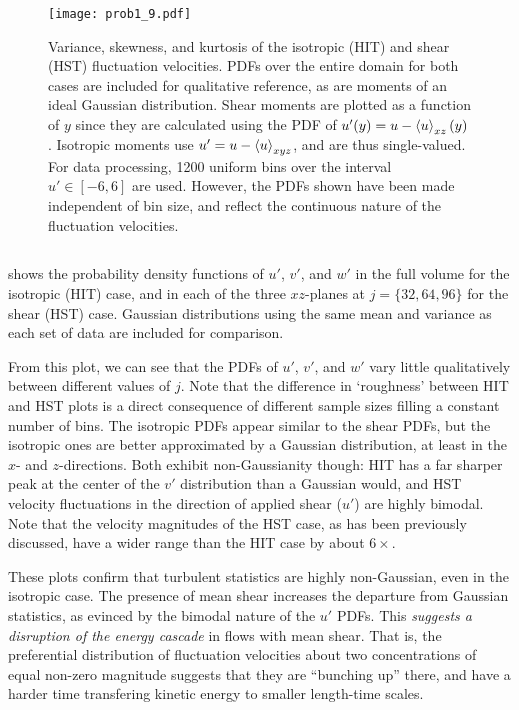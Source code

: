 \documentclass[11pt]{article}
\begin{document}
\begin{figure}[t]
\centering
\texttt{[image: prob1\_9.pdf]}
\vspace{-6pt}
\caption{Variance, skewness, and kurtosis of the isotropic (HIT) and shear (HST) fluctuation velocities. PDFs over the entire domain for both cases are included for qualitative reference, as are moments of an ideal Gaussian distribution. Shear moments are plotted as a function of $y$ since they are calculated using the PDF of $u'(y) = u - \left< u \right>_{xz}(y)$. Isotropic moments use $u' = u - \left< u \right>_{xyz}$, and are thus single-valued. For data processing, 1200 uniform bins over the interval $u' \in [-6,6]$ are used. However, the PDFs shown have been made independent of bin size, and reflect the continuous nature of the fluctuation velocities.}
\label{fig:prob_1_9_skew_kurtosis}
\end{figure}

\subsection{}

 shows the probability density functions of $u'$, $v'$, and $w'$ in the full volume for the isotropic (HIT) case, and in each of the three $xz$-planes at $j=\{32,64,96\}$ for the shear (HST) case. Gaussian distributions using the same mean and variance as each set of data are included for comparison.

From this plot, we can see that the PDFs of $u'$, $v'$, and $w'$ vary little qualitatively between different values of $j$. Note that the difference in `roughness' between HIT and HST plots is a direct consequence of different sample sizes filling a constant number of bins. The isotropic PDFs appear similar to the shear PDFs, but the isotropic ones are better approximated by a Gaussian distribution, at least in the $x$- and $z$-directions. Both exhibit non-Gaussianity though: HIT has a far sharper peak at the center of the $v'$ distribution than a Gaussian would, and HST velocity fluctuations in the direction of applied shear ($u'$) are highly bimodal. Note that the velocity magnitudes of the HST case, as has been previously discussed, have a wider range than the HIT case by about $6\times$.

These plots confirm that turbulent statistics are highly non-Gaussian, even in the isotropic case. The presence of mean shear increases the departure from Gaussian statistics, as evinced by the bimodal nature of the $u'$ PDFs. This \emph{suggests a disruption of the energy cascade} in flows with mean shear. That is, the preferential distribution of fluctuation velocities about two concentrations of equal non-zero magnitude suggests that they are ``bunching up'' there, and have a harder time transfering kinetic energy to smaller length-time scales.
\end{document}
